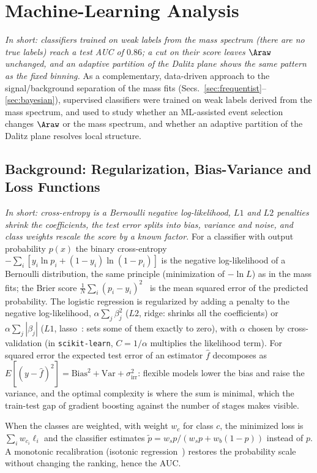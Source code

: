 \FloatBarrier

\section{Machine-Learning Analysis}
\label{sec:ml}
\emph{In short: classifiers trained on weak labels from the mass spectrum (there are no true labels) reach a test AUC of $0.86$; a cut on their score leaves $\Araw$ unchanged, and an adaptive partition of the Dalitz plane shows the same pattern as the fixed binning.}
As a complementary, data-driven approach to the signal/background separation of the mass fits (Secs.~\ref{sec:frequentist}--\ref{sec:bayesian}), supervised classifiers were trained on weak labels derived from the mass spectrum, and used to study whether an ML-assisted event selection changes $\Araw$ or the mass spectrum, and whether an adaptive partition of the Dalitz plane resolves local structure.

\subsection{Background: Regularization, Bias-Variance and Loss Functions}
\label{app:theory_ml}
\emph{In short: cross-entropy is a Bernoulli negative log-likelihood, $L1$ and $L2$ penalties shrink the coefficients, the test error splits into bias, variance and noise, and class weights rescale the score by a known factor.}
For a classifier with output probability $p(x)$ the binary cross-entropy $-\sum_i[y_i\ln p_i+(1-y_i)\ln(1-p_i)]$ is the negative log-likelihood of a Bernoulli distribution, the same principle (minimization of $-\ln L$) as in the mass fits; the Brier score $\frac1N\sum_i(p_i-y_i)^2$~\cite{brier} is the mean squared error of the predicted probability. The logistic regression is regularized by adding a penalty to the negative log-likelihood, $\alpha\sum_j\beta_j^2$ ($L2$, ridge: shrinks all the coefficients) or $\alpha\sum_j|\beta_j|$ ($L1$, lasso~\cite{tibshirani_lasso}: sets some of them exactly to zero), with $\alpha$ chosen by cross-validation (in \texttt{scikit-learn}, $C=1/\alpha$ multiplies the likelihood term). For squared error the expected test error of an estimator $\hat f$ decomposes as $E[(y-\hat f)^2]=\mathrm{Bias}^2+\mathrm{Var}+\sigma^2_{\mathrm{irr}}$: flexible models lower the bias and raise the variance, and the optimal complexity is where the sum is minimal, which the train-test gap of gradient boosting against the number of stages makes visible.

When the classes are weighted, with weight $w_c$ for class $c$, the minimized loss is $\sum_iw_{c_i}\ell_i$ and the classifier estimates $\tilde p=w_sp/(w_sp+w_b(1-p))$ instead of $p$. A monotonic recalibration (isotonic regression~\cite{zadrozny_elkan}) restores the probability scale without changing the ranking, hence the AUC.

